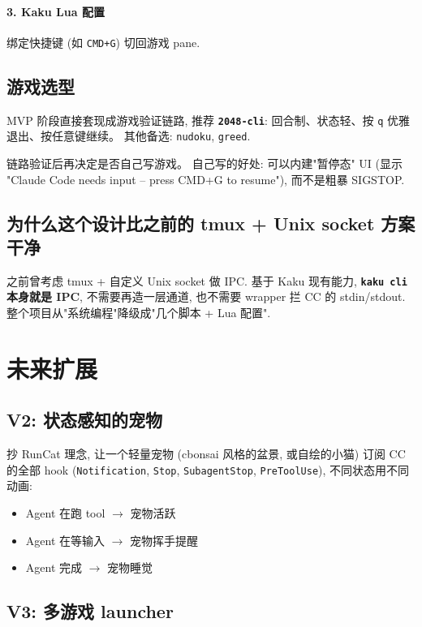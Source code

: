 \documentclass[11pt]{article}
\begin{document}
\paragraph{3. Kaku Lua 配置}
绑定快捷键 (如 \texttt{CMD+G}) 切回游戏 pane.

\subsection{游戏选型}

MVP 阶段直接套现成游戏验证链路, 推荐 \textbf{\texttt{2048-cli}}:
回合制、状态轻、按 \texttt{q} 优雅退出、按任意键继续。
其他备选: \texttt{nudoku}, \texttt{greed}.

链路验证后再决定是否自己写游戏。
自己写的好处: 可以内建"暂停态" UI (显示 "Claude Code needs input -- press CMD+G to resume"),
而不是粗暴 SIGSTOP.

\subsection{为什么这个设计比之前的 tmux + Unix socket 方案干净}

之前曾考虑 tmux + 自定义 Unix socket 做 IPC.
基于 Kaku 现有能力, \textbf{\texttt{kaku cli} 本身就是 IPC},
不需要再造一层通道, 也不需要 wrapper 拦 CC 的 stdin/stdout.
整个项目从"系统编程"降级成"几个脚本 + Lua 配置".

\section{未来扩展}

\subsection{V2: 状态感知的宠物}

抄 RunCat 理念, 让一个轻量宠物 (cbonsai 风格的盆景, 或自绘的小猫)
订阅 CC 的全部 hook (\texttt{Notification}, \texttt{Stop}, \texttt{SubagentStop}, \texttt{PreToolUse}),
不同状态用不同动画:
\begin{itemize}[leftmargin=*]
  \item Agent 在跑 tool $\to$ 宠物活跃
  \item Agent 在等输入 $\to$ 宠物挥手提醒
  \item Agent 完成 $\to$ 宠物睡觉
\end{itemize}

\subsection{V3: 多游戏 launcher}
\end{document}
